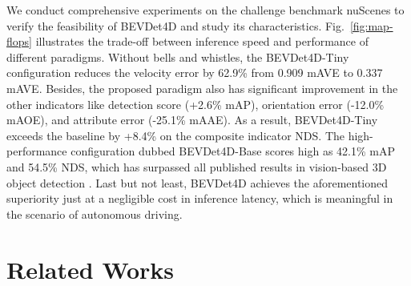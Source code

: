 \documentclass[10pt,twocolumn,letterpaper]{article}
\begin{document}
We conduct comprehensive experiments on the challenge benchmark nuScenes \cite{NS} to verify the feasibility of BEVDet4D and study its characteristics. Fig.~\ref{fig:map-flops} illustrates the trade-off between inference speed and performance of different paradigms. Without bells and whistles, the BEVDet4D-Tiny configuration reduces the velocity error by 62.9\% from 0.909 mAVE to 0.337 mAVE. Besides, the proposed paradigm also has significant improvement in the other indicators like detection score (+2.6\% mAP), orientation error (-12.0\% mAOE), and attribute error (-25.1\% mAAE). As a result, BEVDet4D-Tiny exceeds the baseline by +8.4\% on the composite indicator NDS. The high-performance configuration dubbed BEVDet4D-Base scores high as 42.1\% mAP and 54.5\% NDS, which has surpassed all published results in vision-based 3D object detection \cite{FCOS3D,PGD,DETR3D,PETR,Graph-DETR3D,BEVFormer,BEVDet}. Last but not least, BEVDet4D achieves the aforementioned superiority just at a negligible cost in inference latency, which is meaningful in the scenario of autonomous driving.

\section{Related Works}
\end{document}
